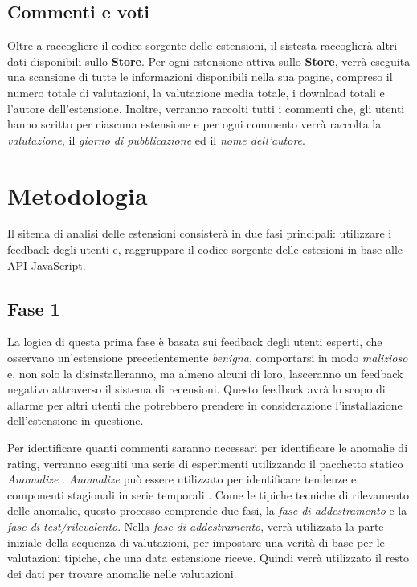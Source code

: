 \documentclass[ 11pt, oneside, italian, onehalfspacing, headsepline, ]{MastersDoctoralThesis}
\begin{document}
{\section{Commenti e voti}}

Oltre a raccogliere il codice sorgente delle estensioni, il sistesta raccoglierà altri dati disponibili sullo \textbf{Store}. Per ogni estensione attiva sullo \textbf{Store}, verrà eseguita una scansione di tutte le informazioni disponibili nella sua pagine, compreso il numero totale di valutazioni, la valutazione media totale, i download totali e l'autore dell'estensione. Inoltre, verranno raccolti tutti i commenti che, gli utenti hanno scritto per ciascuna estensione e per ogni commento verrà raccolta la \textit{valutazione}, il  \textit{giorno di pubblicazione} ed il  \textit{nome dell'autore}.

{\chapter{Metodologia}}

Il sitema di analisi delle estensioni consisterà in due fasi principali: utilizzare i feedback degli utenti e, raggruppare il codice sorgente delle estesioni in base alle API JavaScript.

{\section{Fase 1}}

La logica di questa prima fase è basata sui feedback degli utenti esperti, che osservano un'estensione precedentemente  \textit{benigna}, comportarsi in modo  \textit{malizioso} e, non solo la disinstalleranno, ma almeno alcuni di loro, lasceranno un feedback negativo attraverso il sistema di recensioni. Questo feedback avrà lo scopo di allarme per altri utenti che potrebbero prendere in considerazione l'installazione dell'estensione in questione. \par

Per identificare quanti commenti saranno necessari per identificare le anomalie di rating, verranno eseguiti una serie di esperimenti utilizzando il pacchetto statico \textit{Anomalize} \citep{Anomalize}. \textit{Anomalize} può essere utilizzato per identificare tendenze e componenti stagionali in serie temporali \citep{GeneralizedExtremeStudentized}. Come le tipiche tecniche di rilevamento delle anomalie, questo processo comprende due fasi, la \textit{fase di addestramento} e la \textit{fase di test/rilevalento}. Nella \textit{fase di addestramento}, verrà utilizzata la parte iniziale della sequenza di valutazioni, per impostare una verità di base per le valutazioni tipiche, che una data estensione riceve. Quindi verrà utilizzato il resto dei dati per trovare anomalie nelle valutazioni.
\end{document}
